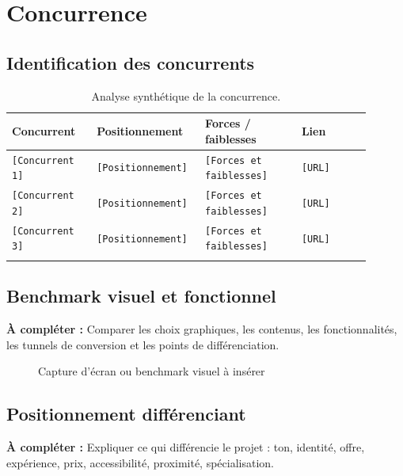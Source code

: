 \documentclass[11pt,a4paper]{report}
\newcommand{\placeholder}[1]{\textcolor{placeholderColor}{\texttt{[#1]}}}
\newcommand{\todo}[1]{\textcolor{todoColor}{\textbf{À compléter :} #1}}
\newcommand{\blankspace}[1]{\vspace*{#1}}
\newcommand{\imageplaceholder}[4][0.85\linewidth]{%
  \begin{figure}[H]
    \centering
    \fbox{%
      \begin{minipage}[c][#2][c]{#1}
        \centering
        \textcolor{midgray}{\Large Emplacement image}\\[0.4cm]
        \textcolor{midgray}{#3}
      \end{minipage}%
    }
    \caption{#3}
    \label{#4}
  \end{figure}
}
\begin{document}
\chapter{Concurrence}

\section{Identification des concurrents}
\begin{longtable}{p{0.22\linewidth}p{0.25\linewidth}p{0.25\linewidth}p{0.18\linewidth}}
\toprule
\textbf{Concurrent} & \textbf{Positionnement} & \textbf{Forces / faiblesses} & \textbf{Lien} \\
\midrule
\endhead
\placeholder{Concurrent 1} & \placeholder{Positionnement} & \placeholder{Forces et faiblesses} & \placeholder{URL} \\
\placeholder{Concurrent 2} & \placeholder{Positionnement} & \placeholder{Forces et faiblesses} & \placeholder{URL} \\
\placeholder{Concurrent 3} & \placeholder{Positionnement} & \placeholder{Forces et faiblesses} & \placeholder{URL} \\
\bottomrule
\caption{Analyse synthétique de la concurrence.}
\label{tab:concurrence}
\end{longtable}

\section{Benchmark visuel et fonctionnel}
\todo{Comparer les choix graphiques, les contenus, les fonctionnalités, les tunnels de conversion et les points de différenciation.}

\imageplaceholder{7cm}{Capture d'écran ou benchmark visuel à insérer}{fig:benchmark-placeholder}

\section{Positionnement différenciant}
\todo{Expliquer ce qui différencie le projet : ton, identité, offre, expérience, prix, accessibilité, proximité, spécialisation.}
\blankspace{6cm}

\end{document}
